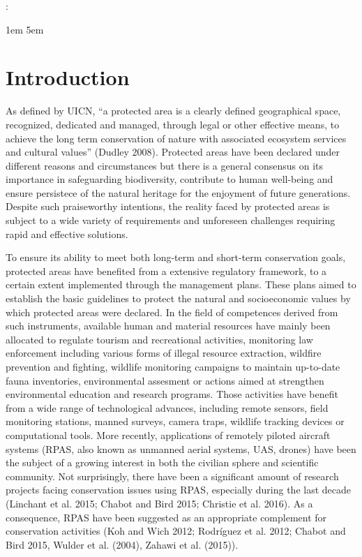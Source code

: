\documentclass[]{interact}
\theoremstyle{plain}%
\theoremstyle{definition}
\theoremstyle{remark}
\begin{document}
    
 : \par
  \begingroup
  \leftskip1em
  \rightskip\leftskip
  \rightskip5em
  \par
  \endgroup
  \vspace{5mm}


% 

\vskip 6.5pt

\noindent  \section{Introduction}\label{introduction}

As defined by UICN, ``a protected area is a clearly defined geographical
space, recognized, dedicated and managed, through legal or other
effective means, to achieve the long term conservation of nature with
associated ecosystem services and cultural values'' (Dudley 2008).
Protected areas have been declared under different reasons and
circumstances but there is a general consensus on its importance in
safeguarding biodiversity, contribute to human well-being and ensure
persistece of the natural heritage for the enjoyment of future
generations. Despite such praiseworthy intentions, the reality faced by
protected areas is subject to a wide variety of requirements and
unforeseen challenges requiring rapid and effective solutions.

To ensure its ability to meet both long-term and short-term conservation
goals, protected areas have benefited from a extensive regulatory
framework, to a certain extent implemented through the management plans.
These plans aimed to establish the basic guidelines to protect the
natural and socioeconomic values by which protected areas were declared.
In the field of competences derived from such instruments, available
human and material resources have mainly been allocated to regulate
tourism and recreational activities, monitoring law enforcement
including various forms of illegal resource extraction, wildfire
prevention and fighting, wildlife monitoring campaigns to maintain
up-to-date fauna inventories, environmental assesment or actions aimed
at strengthen environmental education and research programs. Those
activities have benefit from a wide range of technological advances,
including remote sensors, field monitoring stations, manned surveys,
camera traps, wildlife tracking devices or computational tools. More
recently, applications of remotely piloted aircraft systems (RPAS, also
known as unmanned aerial systems, UAS, drones) have been the subject of
a growing interest in both the civilian sphere and scientific community.
Not surprisingly, there have been a significant amount of research
projects facing conservation issues using RPAS, especially during the
last decade (Linchant et al. 2015; Chabot and Bird 2015; Christie et al.
2016). As a consequence, RPAS have been suggested as an appropriate
complement for conservation activities (Koh and Wich 2012; Rodríguez et
al. 2012; Chabot and Bird 2015, Wulder et al. (2004), Zahawi et al.
(2015)).
\end{document}
